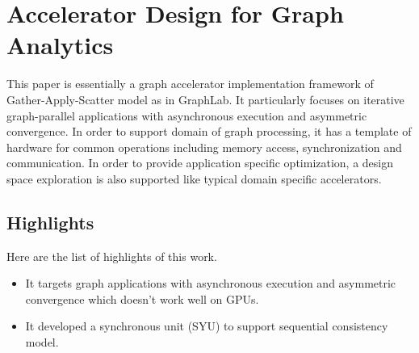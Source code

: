 \section{Accelerator Design for Graph Analytics}
This paper \cite{ozdal2016energy} is essentially a graph accelerator implementation framework of Gather-Apply-Scatter model as in
GraphLab. It particularly focuses on iterative graph-parallel applications with asynchronous
execution and asymmetric convergence. In order to support domain of graph processing, it has a
template of hardware for common operations including memory access, synchronization and
communication. In order to provide application specific optimization, a design space exploration is
also supported like typical domain specific accelerators.

\subsection{Highlights}
Here are the list of highlights of this work.
\begin{itemize}
    \item It targets graph applications with asynchronous execution and asymmetric convergence which
        doesn't work well on GPUs.
    \item It developed a synchronous unit (SYU) to support sequential consistency model. 
\end{itemize}
